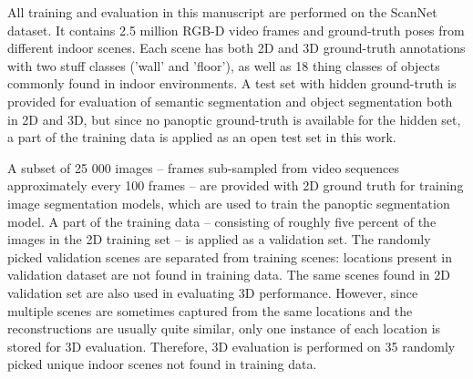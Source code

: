 
All training and evaluation in this manuscript are performed on the ScanNet \cite{scannet} dataset. It contains 2.5 million RGB-D video frames and ground-truth poses from different indoor scenes. Each scene has both 2D and 3D ground-truth annotations with two stuff classes ('wall' and 'floor'), as well as 18 thing classes of objects commonly found in indoor environments. A test set with hidden ground-truth is provided for evaluation of semantic segmentation and object segmentation both in 2D and 3D, but since no panoptic ground-truth is available for the hidden set, a part of the training data is applied as an open test set in this work.

A subset of 25 000 images -- frames sub-sampled from video sequences approximately every 100 frames -- are provided with 2D ground truth for training image segmentation models, which are used to train the panoptic segmentation model. A part of the training data -- consisting of roughly five percent of the images in the 2D training set -- is applied as a validation set. The randomly picked validation scenes are separated from training scenes: locations present in validation dataset are not found in training data. The same scenes found in 2D validation set are also used in evaluating 3D performance. However, since multiple scenes are sometimes captured from the same locations and the reconstructions are usually quite similar, only one instance of each location is stored for 3D evaluation. Therefore, 3D evaluation is performed on 35 randomly picked unique indoor scenes not found in training data.
